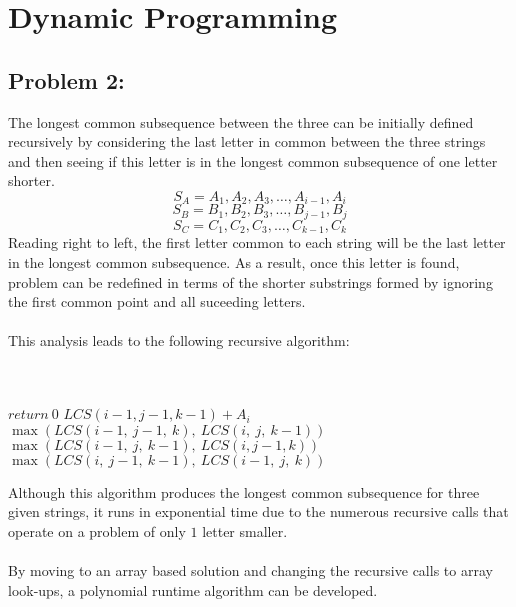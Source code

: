 \documentclass[12pt]{article}
\begin{document}
\section*{Dynamic Programming}
\subsection*{Problem 2:}
The longest common subsequence between the three can be
initially defined recursively by considering the last 
letter in common between the three strings and then 
seeing if this letter is in the longest common subsequence
of one letter shorter.
\[
S_A = A_1, A_2, A_3,\dots,A_{i-1},A_i
\]
\[
S_B = B_1, B_2, B_3,\dots,B_{j-1},B_j
\]
\[
S_C = C_1, C_2, C_3,\dots,C_{k-1},C_k
\]
Reading right to left, the first letter common to each string will
be the last letter in the longest common subsequence.  As a result,
once this letter is found, problem can be redefined in terms of the 
shorter substrings formed by ignoring the first common point and 
all suceeding letters.\\\\
This analysis leads to the following recursive algorithm:\\\\
\begin{algorithm}[H]
\\
{$return\ 0$}
{$LCS(i-1,j-1,k-1) + A_i$}
{$\max(LCS(i-1,\ j-1,\ k),\ LCS(i,\ j,\ k-1))$}
{$\max(LCS(i-1,\ j,\ k-1),\ LCS(i, j-1, k))$}
{$\max(LCS(i,\ j-1,\ k-1),\ LCS(i-1,\ j,\ k))$}
\end{algorithm}
Although this algorithm produces the longest common subsequence for
three given strings, it runs in exponential time due to the numerous
recursive calls that operate on a problem of only $1$ letter smaller.\\\\
By moving to an array based solution and changing the recursive calls 
to array look-ups, a polynomial runtime algorithm can be developed.\\\\
\end{document}
